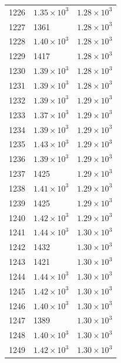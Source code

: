 \begin{table}[H]
\begin{tabular}{lll}
1226 & $\displaystyle 1.35 \times 10^{3}$ & $\displaystyle 1.28 \times 10^{3}$ \\
1227 & 1361 & $\displaystyle 1.28 \times 10^{3}$ \\
1228 & $\displaystyle 1.40 \times 10^{3}$ & $\displaystyle 1.28 \times 10^{3}$ \\
1229 & 1417 & $\displaystyle 1.28 \times 10^{3}$ \\
1230 & $\displaystyle 1.39 \times 10^{3}$ & $\displaystyle 1.28 \times 10^{3}$ \\
1231 & $\displaystyle 1.39 \times 10^{3}$ & $\displaystyle 1.28 \times 10^{3}$ \\
1232 & $\displaystyle 1.39 \times 10^{3}$ & $\displaystyle 1.29 \times 10^{3}$ \\
1233 & $\displaystyle 1.37 \times 10^{3}$ & $\displaystyle 1.29 \times 10^{3}$ \\
1234 & $\displaystyle 1.39 \times 10^{3}$ & $\displaystyle 1.29 \times 10^{3}$ \\
1235 & $\displaystyle 1.43 \times 10^{3}$ & $\displaystyle 1.29 \times 10^{3}$ \\
1236 & $\displaystyle 1.39 \times 10^{3}$ & $\displaystyle 1.29 \times 10^{3}$ \\
1237 & 1425 & $\displaystyle 1.29 \times 10^{3}$ \\
1238 & $\displaystyle 1.41 \times 10^{3}$ & $\displaystyle 1.29 \times 10^{3}$ \\
1239 & 1425 & $\displaystyle 1.29 \times 10^{3}$ \\
1240 & $\displaystyle 1.42 \times 10^{3}$ & $\displaystyle 1.29 \times 10^{3}$ \\
1241 & $\displaystyle 1.44 \times 10^{3}$ & $\displaystyle 1.30 \times 10^{3}$ \\
1242 & 1432 & $\displaystyle 1.30 \times 10^{3}$ \\
1243 & 1421 & $\displaystyle 1.30 \times 10^{3}$ \\
1244 & $\displaystyle 1.44 \times 10^{3}$ & $\displaystyle 1.30 \times 10^{3}$ \\
1245 & $\displaystyle 1.42 \times 10^{3}$ & $\displaystyle 1.30 \times 10^{3}$ \\
1246 & $\displaystyle 1.40 \times 10^{3}$ & $\displaystyle 1.30 \times 10^{3}$ \\
1247 & 1389 & $\displaystyle 1.30 \times 10^{3}$ \\
1248 & $\displaystyle 1.40 \times 10^{3}$ & $\displaystyle 1.30 \times 10^{3}$ \\
1249 & $\displaystyle 1.42 \times 10^{3}$ & $\displaystyle 1.30 \times 10^{3}$ \\

\end{tabular}
\end{table}
